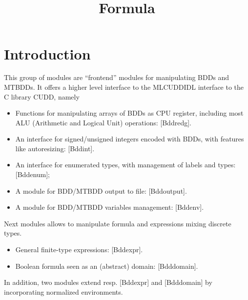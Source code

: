 \documentclass[twoside,10pt,a4paper]{report}
\title{Formula}
\begin{document}
\maketitle

\tableofcontents

\chapter{Introduction}

This group of modules are ``frontend'' modules for manipulating BDDs and
MTBDDs.  It offers a higher level interface to the MLCUDDIDL interface to the
C library CUDD, namely
\begin{itemize}
\item Functions for manipulating arrays of BDDs as CPU register, including
  most ALU (Arithmetic and Logical Unit) operations: [Bddredg].
\item An interface for signed/unsigned integers encoded with BDDs, with
  features like autoresizing: [Bddint].
\item An interface for enumerated types, with management of labels and types: [Bddenum];
\item A module for BDD/MTBDD output to file: [Bddoutput].
\item A module for BDD/MTBDD variables management: [Bddenv].
\end{itemize}
Next modules allows to manipulate formula and expressions mixing
discrete types.
\begin{itemize}
\item General finite-type expressions: [Bddexpr].
\item Boolean formula seen as an (abstract) domain: [Bdddomain].
\end{itemize}
In addition, two modules extend resp. [Bddexpr] and [Bdddomain]
by incorporating normalized environments.


\end{document}
